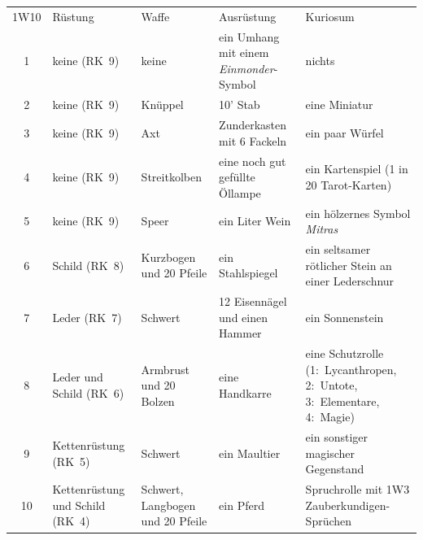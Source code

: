 \documentclass[11pt]{wbzine}
\begin{document}
\begin{tabularx}{\textwidth}{cZZZZ}
    1W10 & Rüstung & Waffe & Ausrüstung & Kuriosum \\
1 &
    keine (RK~9) &
    keine &
    ein Umhang mit einem \textit{Einmonder}-Symbol &
    nichts \\

2 &
 keine (RK~9) &
    Knüppel &
    10' Stab &
    eine Miniatur\\

3 &
 keine (RK~9) &
   Axt &
  Zunderkasten mit 6 Fackeln &
  ein paar Würfel\\

4 &
 keine (RK~9) &
 Streitkolben &
 eine noch gut gefüllte Öllampe &
    ein Kartenspiel (1 in 20 Tarot-Karten)\\

5 &
 keine (RK~9) &
 Speer &
 ein Liter Wein &
 ein hölzernes Symbol \textit{Mitras}\\

6 &
 Schild (RK~8) &
 Kurzbogen und 20 Pfeile & 
 ein Stahlspiegel &
 ein seltsamer rötlicher Stein 
    an einer Lederschnur\\

7 &
 Leder (RK~7) &
 Schwert &
 12 Eisennägel und einen Hammer &
 ein Sonnenstein \\

8 &
 Leder und Schild (RK~6) &
 Armbrust und 20 Bolzen &
 eine Handkarre &
 eine Schutzrolle (1:~Lycanthropen, 2:~Untote, 3:~Elementare, 
    4:~Magie)\\

9 &
 Kettenrüstung (RK~5) &
 Schwert &
 ein Maultier &
ein sonstiger magischer Gegenstand\\

10 &
 Kettenrüstung und Schild (RK~4) &
 Schwert, Langbogen und 20 Pfeile &
 ein Pferd &
Spruchrolle mit 1W3 
    Zauberkundigen-Sprüchen\\

\end{tabularx}
\end{document}
